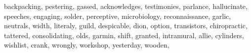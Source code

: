 \documentclass[
  12pt,
]{book}
\newenvironment{Shaded}{\begin{snugshade}}{\end{snugshade}}
\newcommand{\NormalTok}[1]{#1}
\newcommand{\StringTok}[1]{\textcolor[rgb]{0.31,0.60,0.02}{#1}}
\begin{document}
\begin{Shaded}
\begin{Highlighting}[]
                \StringTok{\textquotesingle{}backpacking\textquotesingle{}}\NormalTok{, }\StringTok{\textquotesingle{}pestering\textquotesingle{}}\NormalTok{, }\StringTok{\textquotesingle{}gassed\textquotesingle{}}\NormalTok{, }\StringTok{\textquotesingle{}acknowledges\textquotesingle{}}\NormalTok{,}
                \StringTok{\textquotesingle{}testimonies\textquotesingle{}}\NormalTok{, }\StringTok{\textquotesingle{}parlance\textquotesingle{}}\NormalTok{, }\StringTok{\textquotesingle{}hallucinate\textquotesingle{}}\NormalTok{, }\StringTok{\textquotesingle{}speeches\textquotesingle{}}\NormalTok{,}
                \StringTok{\textquotesingle{}engaging\textquotesingle{}}\NormalTok{, }\StringTok{\textquotesingle{}solder\textquotesingle{}}\NormalTok{, }\StringTok{\textquotesingle{}perceptive\textquotesingle{}}\NormalTok{, }\StringTok{\textquotesingle{}microbiology\textquotesingle{}}\NormalTok{, }\StringTok{\textquotesingle{}reconnaissance\textquotesingle{}}\NormalTok{, }\StringTok{\textquotesingle{}garlic\textquotesingle{}}\NormalTok{,}
                \StringTok{\textquotesingle{}neutrals\textquotesingle{}}\NormalTok{, }\StringTok{\textquotesingle{}width\textquotesingle{}}\NormalTok{, }\StringTok{\textquotesingle{}literaly\textquotesingle{}}\NormalTok{, }\StringTok{\textquotesingle{}guild\textquotesingle{}}\NormalTok{, }\StringTok{\textquotesingle{}despicable\textquotesingle{}}\NormalTok{, }\StringTok{\textquotesingle{}dion\textquotesingle{}}\NormalTok{,}
                \StringTok{\textquotesingle{}option\textquotesingle{}}\NormalTok{, }\StringTok{\textquotesingle{}transistors\textquotesingle{}}\NormalTok{, }\StringTok{\textquotesingle{}chiropractic\textquotesingle{}}\NormalTok{, }\StringTok{\textquotesingle{}tattered\textquotesingle{}}\NormalTok{, }\StringTok{\textquotesingle{}consolidating\textquotesingle{}}\NormalTok{,}
                \StringTok{\textquotesingle{}olds\textquotesingle{}}\NormalTok{, }\StringTok{\textquotesingle{}garmin\textquotesingle{}}\NormalTok{, }\StringTok{\textquotesingle{}shift\textquotesingle{}}\NormalTok{, }\StringTok{\textquotesingle{}granted\textquotesingle{}}\NormalTok{, }\StringTok{\textquotesingle{}intramural\textquotesingle{}}\NormalTok{, }\StringTok{\textquotesingle{}allie\textquotesingle{}}\NormalTok{, }\StringTok{\textquotesingle{}cylinders\textquotesingle{}}\NormalTok{,}
                \StringTok{\textquotesingle{}wishlist\textquotesingle{}}\NormalTok{, }\StringTok{\textquotesingle{}crank\textquotesingle{}}\NormalTok{, }\StringTok{\textquotesingle{}wrongly\textquotesingle{}}\NormalTok{, }\StringTok{\textquotesingle{}workshop\textquotesingle{}}\NormalTok{, }\StringTok{\textquotesingle{}yesterday\textquotesingle{}}\NormalTok{, }\StringTok{\textquotesingle{}wooden\textquotesingle{}}\NormalTok{, }

\end{Highlighting}
\end{Shaded}
\end{document}
